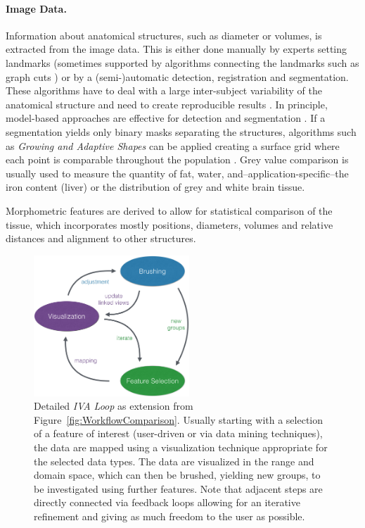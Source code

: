 \documentclass[journal]{style/vgtc} 			          %
\begin{document}
\paragraph{Image Data. }
Information about anatomical structures, such as diameter or volumes, is extracted from the image data.
%
This is either done manually by experts setting landmarks (sometimes supported by algorithms connecting the landmarks such as graph cuts \cite{GraphCut}) or by a (semi-)automatic detection, registration and segmentation.
%
These algorithms have to deal with a large inter-subject variability of the anatomical structure and need to create reproducible results \cite{Preim2014}.
%
In principle, model-based approaches are effective for detection \cite{Rak2013} and segmentation \cite{Gloger2010, Gloger2012}.
%
If a segmentation yields only binary masks separating the structures, algorithms such as \emph{Growing and Adaptive Shapes} can be applied creating a surface grid where each point is comparable throughout the population \cite{Ferrarini2007}.
%
Grey value comparison is usually used to measure the quantity of fat, water, and--application-specific--the iron content (liver) or the distribution of grey and white brain tissue.

Morphometric features are derived to allow for statistical comparison of the tissue, which incorporates mostly positions, diameters, volumes and relative distances and alignment to other structures.
\begin{figure}[htb]
 \centering
 \includegraphics[width=2.3in]{figures/InteractionLoop}
 \caption{Detailed \emph{IVA Loop} as extension from Figure~\ref{fig:WorkflowComparison}.
 Usually starting with a selection of a feature of interest (user-driven or via data mining techniques), the data are mapped using a visualization technique appropriate for the selected data types.
 The data are visualized in the range and domain space, which can then be brushed, yielding new groups, to be investigated using further features.
 Note that adjacent steps are directly connected via feedback loops allowing for an iterative refinement and giving as much freedom to the user as possible.}
 \label{fig:InteractionLoop}
\end{figure}
\end{document}

